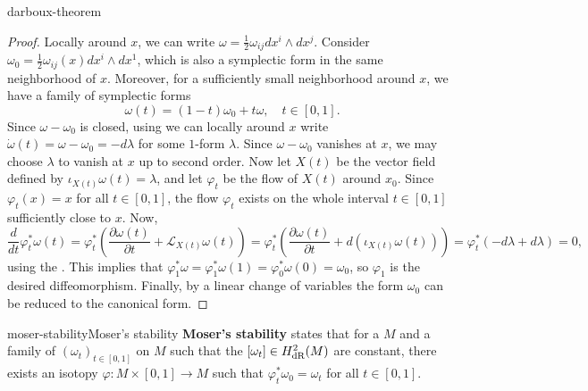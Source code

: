\begin{example}{darboux-theorem}
    \begin{proof}
        Locally around $x$, we can write $\omega = \frac{1}{2} \omega_{ij} dx^i \wedge dx^j$. Consider $\omega_0 = \frac{1}{2} \omega_{ij}(x) dx^i \wedge dx^1$, which is also a symplectic form in the same neighborhood of $x$. Moreover, for a sufficiently small neighborhood around $x$, we have a family of symplectic forms
        \[ \omega(t) = (1 - t) \omega_0 + t \omega , \quad t \in [0, 1] . \]
        Since $\omega - \omega_0$ is closed, using  we can locally around $x$ write $\dot{\omega}(t) = \omega - \omega_0 = - d \lambda$ for some $1$-form $\lambda$. Since $\omega - \omega_0$ vanishes at $x$, we may choose $\lambda$ to vanish at $x$ up to second order. Now let $X(t)$ be the vector field defined by $\iota_{X(t)} \omega(t) = \lambda$, and let $\varphi_t$ be the flow of $X(t)$ around $x_0$. Since $\varphi_t(x) = x$ for all $t \in [0, 1]$, the flow $\varphi_t$ exists on the whole interval $t \in [0, 1]$ sufficiently close to $x$. Now,
        \[ \frac{d}{dt} \varphi_t^* \omega(t) = \varphi_t^* \left(\frac{\partial \omega(t)}{\partial t} + \mathcal{L}_{X(t)} \omega(t) \right) = \varphi_t^* \left(\frac{\partial \omega(t)}{\partial t} + d(\iota_{X(t)} \omega(t)) \right) = \varphi_t^* \left( -d \lambda + d \lambda \right) = 0 , \]
        using the . This implies that $\varphi_1^* \omega = \varphi_1^* \omega(1) = \varphi_0^* \omega(0) = \omega_0$, so $\varphi_1$ is the desired diffeomorphism. Finally, by a linear change of variables the form $\omega_0$ can be reduced to the canonical form.
    \end{proof}
\end{example}

\begin{topic}{moser-stability}{Moser's stability}
    \textbf{Moser's stability} states that for a   $M$ and a family of  $(\omega_t)_{t \in [0, 1]}$ on $M$ such that the  $[\omega_t] \in H^2_{\textup{dR}}(M)$ are constant, there exists an isotopy $\varphi : M \times [0, 1] \to M$ such that $\varphi_t^* \omega_0 = \omega_t$ for all $t \in [0, 1]$.
\end{topic}

